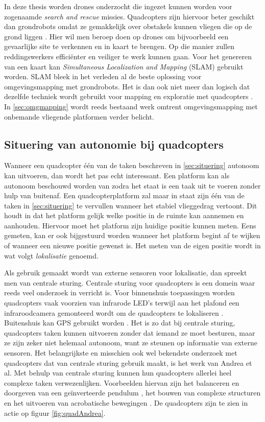\npar In deze thesis worden drones onderzocht die ingezet kunnen worden voor zogenaamde \textit{search and rescue} missies. Quadcopters zijn hiervoor beter geschikt dan grondrobots omdat ze gemakkelijk over obstakels kunnen vliegen die op de grond liggen \cite{paper:SLAMQuad2}\cite{paper:SearchRescueQuad}. Hier wil men beroep doen op drones om bijvoorbeeld een gevaarlijke site te verkennen en in kaart te brengen. Op die manier zullen reddingswerkers effici\"enter en veiliger te werk kunnen gaan. Voor het genereren van een kaart kan \textit{Simultaneous Localization and Mapping} (SLAM) gebruikt worden. SLAM bleek in het verleden al de beste oplossing voor omgevingsmapping met grondrobots. Het is dan ook niet meer dan logisch dat dezelfde techniek wordt gebruikt voor mapping en exploratie met quadcopters \cite{paper:SLAMQuad}. In \ref{sec:omgmapping} wordt reeds bestaand werk omtrent omgevingsmapping met onbemande vliegende platformen verder belicht.

\subsection{Situering van autonomie bij quadcopters} \label{sec:lcsturing}
Wanneer een quadcopter \'e\'en van de taken beschreven in \ref{sec:situering} autonoom kan uitvoeren, dan wordt het pas echt interessant. Een platform kan als autonoom beschouwd worden van zodra het staat is een taak uit te voeren zonder hulp van buitenaf. Een quadcopterplatform zal maar in staat zijn \'e\'en van de taken in \ref{sec:situering} te vervullen wanneer het stabiel vlieggedrag vertoont. Dit houdt in dat het platform gelijk welke positie in de ruimte kan aannemen en aanhouden. Hiervoor moet het platform zijn huidige positie kunnen meten. Eens gemeten, kan er ook bijgestuurd worden wanneer het platform begint af te wijken of wanneer een nieuwe positie gewenst is. Het meten van de eigen positie wordt in wat volgt \textit{lokalisatie} genoemd.

\npar Als gebruik gemaakt wordt van externe sensoren voor lokalisatie, dan spreekt men van centrale sturing. Centrale sturing voor quadcopters is een domein waar reeds veel onderzoek in verricht is.  Voor binnenshuis toepassingen worden quadcopters vaak voorzien van infrarode LED's terwijl aan het plafond een infraroodcamera gemonteerd wordt om de quadcopters te lokaliseren \cite{paper:flyingInvertedPendulum}. Buitenshuis kan GPS gebruikt worden \cite{paper:deliveryQuad}. Het is zo dat bij centrale sturing, quadcopters taken kunnen uitvoeren zonder dat iemand ze moet besturen, maar ze zijn zeker niet helemaal autonoom, want ze steunen op informatie van externe sensoren. Het belangrijkste en misschien ook wel bekendste onderzoek met quadcopters dat van centrale sturing gebruik maakt, is het werk van Andrea et al. Met behulp van centrale sturing kunnen hun quadcopters allerlei heel complexe taken verwezenlijken. Voorbeelden hiervan zijn het balanceren en doorgeven van een ge\"inverteerde pendulum \cite{paper:flyingInvertedPendulum}, het bouwen van complexe structuren \cite{paper:buildingQuad} en het uitvoeren van acrobatische bewegingen \cite{paper:multiflips}. De quadcopters zijn te zien in actie op figuur \ref{fig:quadAndrea}.

